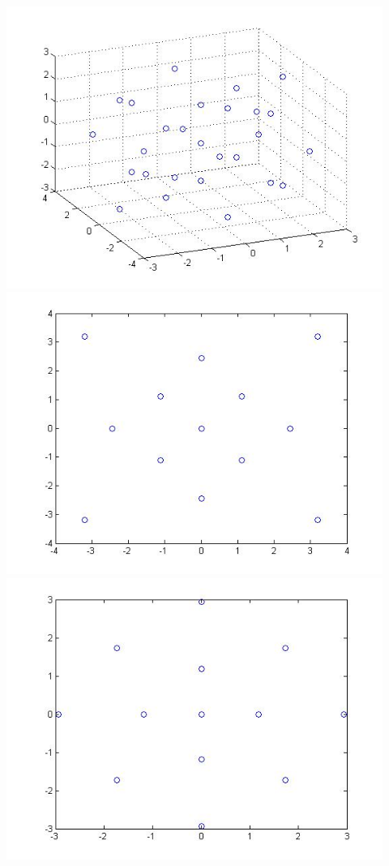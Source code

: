 \documentclass[landscape]{slides}
\begin{document}
\begin{slide} 
	\centering
		\includegraphics[width=0.92\textwidth]{3d6thmomentpts.jpg}
	\label{fig:3d6thmomentpts}
\newline
	\includegraphics[width=0.92\textwidth]{2dcorr6thmomentpts.jpg}
	\includegraphics[width=0.92\textwidth]{2d_weird_case2.jpg}
	\label{fig:eye2quadpts}
\end{slide}
\end{document}

